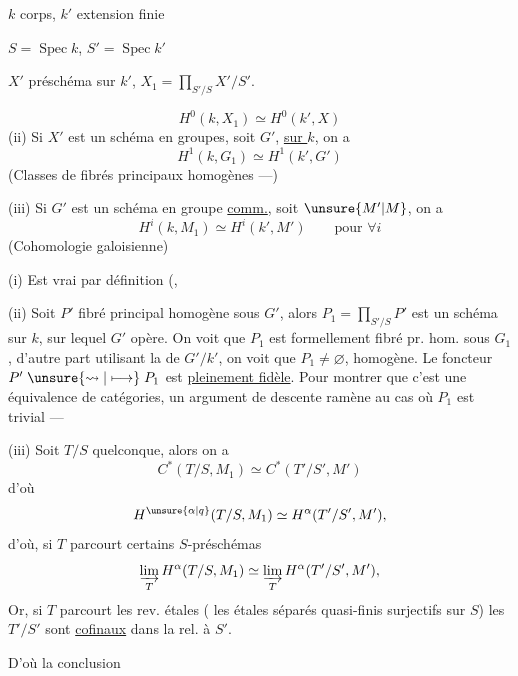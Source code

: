 $k$ corps, $k'$ extension finie

$S=\operatorname{Spec}k$, $S'=\operatorname{Spec}k'$


 $X'$ préschéma sur $k'$, $X_1=\prod_{S'/S}X'/S'$.

\[
\boxed{H^0(k,X_1)\simeq H^0(k',X)}\tag*{(i)}
\]
(ii) Si $X'$ est un schéma en groupes, soit $G'$, \uline{ sur $k$}, on a
\[
\boxed{H^1(k,G_1)\simeq H^1(k',G')}
\]
(Classes de fibrés principaux homogènes ---)

(iii) Si $G'$ est  un schéma en groupe \uline{comm.}, soit $\unsure{M'|M}$, on a
\[
\boxed{H^i(k,M_1)\simeq H^i(k',M')}\qquad\text{pour }\forall i
\]
(Cohomologie galoisienne)

(i) Est vrai par définition (,

(ii) Soit $P'$ fibré principal homogène sous $G'$, alors $P_1=\prod_{S'/S}P'$ est un schéma sur $k$, sur lequel $G'$ opère. On voit que $P_1$ est formellement fibré pr. hom. sous $G_1$, d'autre  part utilisant la  de $G'/k'$, on voit que $P_1\ne\varnothing$,   homogène.
Le foncteur $P'\mathrel{\unsure{\rightsquigarrow|\longmapsto}}P_1$ est \uline{pleinement fidèle}.
Pour montrer que c'est une équivalence de catégories, un argument de descente ramène au cas où $P_1$ est trivial ---

(iii) Soit $T/S$  quelconque, alors on a
\[
C^*(T/S,M_1)\simeq C^*(T'/S',M')
\]
d'où
\[
H^{\unsure{\alpha|q}}(T/S,M_1)\simeq H^\alpha(T'/S',M'),
\]
d'où, si $T$ parcourt certains $S$-préschémas
\[
\varinjlim_T H^\alpha(T/S,M_1)\simeq\varinjlim_T H^\alpha(T'/S',M'),
\]
Or, si $T$ parcourt les rev. étales ( les  étales séparés quasi-finis surjectifs sur $S$) les $T'/S'$ sont \uline{cofinaux} dans la   rel. à $S'$.

D'où la conclusion


